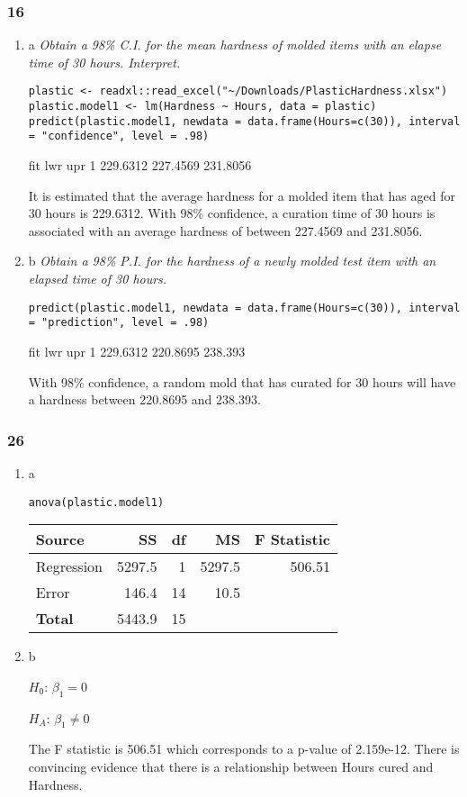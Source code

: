 \documentclass[11pt]{article}
\begin{document}
\subsubsection{16}
\label{sec:org6aec14d}
\begin{enumerate}
\item a
\label{sec:org3a42668}
\emph{Obtain a 98\% C.I. for the mean hardness of molded items with an elapse time of
30 hours. Interpret.}

\begin{verbatim}
plastic <- readxl::read_excel("~/Downloads/PlasticHardness.xlsx")
plastic.model1 <- lm(Hardness ~ Hours, data = plastic)
predict(plastic.model1, newdata = data.frame(Hours=c(30)), interval = "confidence", level = .98)
\end{verbatim}
       fit      lwr      upr
1 229.6312 227.4569 231.8056

It is estimated that the average hardness for a molded item that has aged for 30
hours is 229.6312. With 98\% confidence, a curation time of 30 hours is
associated with an average hardness of between 227.4569 and 231.8056.
\item b
\label{sec:orgffb9009}
\emph{Obtain a 98\% P.I. for the hardness of a newly molded test item with an elapsed
time of 30 hours.}

\begin{verbatim}
predict(plastic.model1, newdata = data.frame(Hours=c(30)), interval = "prediction", level = .98)
\end{verbatim}
       fit      lwr     upr
1 229.6312 220.8695 238.393

With 98\% confidence, a random mold that has curated for 30 hours will have
a hardness between 220.8695 and 238.393.
\end{enumerate}
\subsubsection{26}
\label{sec:org87324d8}
\begin{enumerate}
\item a
\label{sec:orgf35efd8}
\begin{verbatim}
anova(plastic.model1)
\end{verbatim}
\begin{center}
\begin{tabular}{lrrrr}
Source & SS & df & MS & F Statistic\\
\hline
Regression & 5297.5 & 1 & 5297.5 & 506.51\\
Error & 146.4 & 14 & 10.5 & \\
\textbf{Total} & 5443.9 & 15 &  & \\
\end{tabular}
\end{center}
\item b
\label{sec:org75d03aa}

\(H_0\): \(\beta_1 = 0\)

\(H_A\): \(\beta_1 \neq 0\)

The F statistic is 506.51 which corresponds to a p-value of 2.159e-12. There is
convincing evidence that there is a relationship between Hours cured and Hardness.
\end{enumerate}
\end{document}
